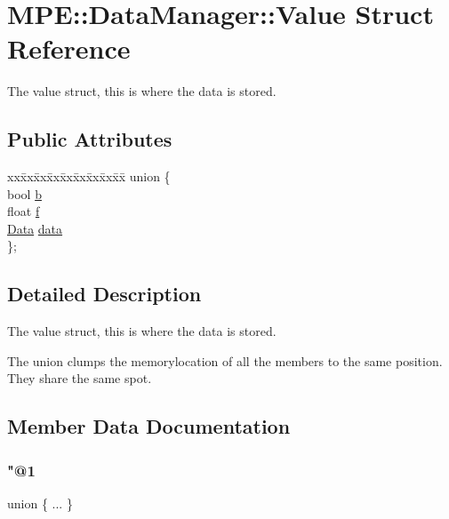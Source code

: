 \hypertarget{struct_m_p_e_1_1_data_manager_1_1_value}{}\section{M\+PE\+:\+:Data\+Manager\+:\+:Value Struct Reference}
\label{struct_m_p_e_1_1_data_manager_1_1_value}


The value struct, this is where the data is stored.  


\subsection*{Public Attributes}
\begin{DoxyCompactItemize}
\item 
\begin{tabbing}
xx\=xx\=xx\=xx\=xx\=xx\=xx\=xx\=xx\=\kill
union \{\\
\>bool \hyperlink{struct_m_p_e_1_1_data_manager_1_1_value_ab73221cbb6b780c28189d227b18f9902}{b}\\
\>float \hyperlink{struct_m_p_e_1_1_data_manager_1_1_value_af78b09bc5c84d6ecaf359ffc9c3bc4ed}{f}\\
\>\hyperlink{struct_m_p_e_1_1_data_manager_1_1_data}{Data} \hyperlink{struct_m_p_e_1_1_data_manager_1_1_value_a93d67c58c822d95e6412fe126cf15e76}{data}\\
\}; \\

\end{tabbing}\end{DoxyCompactItemize}


\subsection{Detailed Description}
The value struct, this is where the data is stored. 

The union clumps the memorylocation of all the members to the same position. They share the same spot. 

\subsection{Member Data Documentation}
\mbox{\label{struct_m_p_e_1_1_data_manager_1_1_value_aaf08009cf0bd28f7a6688c84917b60ea}} 
\subsubsection{\texorpdfstring{"@1}{@1}}
{\footnotesize\ttfamily union \{ ... \} }

